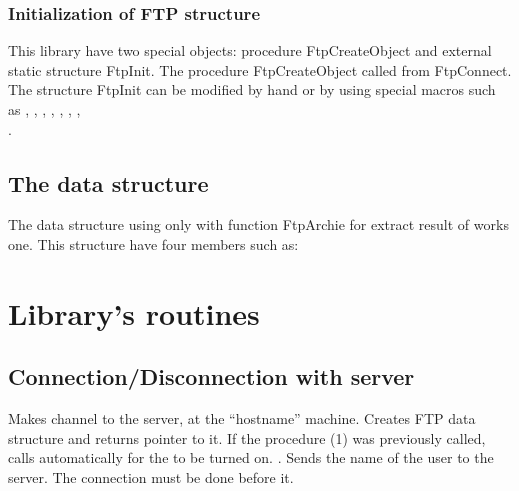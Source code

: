 


\subsubsection{Initialization of FTP structure}

This library have two special objects: procedure FtpCreateObject and external
static structure FtpInit. The procedure FtpCreateObject called from 
FtpConnect. The structure FtpInit can be modified by hand or by using special
macros such as , , , , , , , \\ 
.

\subsection{The   data structure}

The  data structure using only with function FtpArchie for extract
result of works one. This structure have four members such as:






\section{Library's routines}

\subsection{Connection/Disconnection with server}

{
  Makes channel to the server, at the ``hostname'' machine.
  Creates FTP data structure and returns pointer to it. If the procedure (1)
was previously called,  calls automatically  for the  to be turned on. 
  .
}
{
 Sends the name of the user to the server. The connection must be done before it.
}


